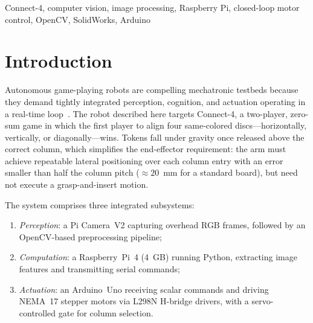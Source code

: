 \documentclass[conference]{IEEEtran}
\begin{document}
\begin{abstract}
This paper presents the design and implementation of an autonomous Vision-Based
Connect-4 Robot, a mechatronic system that integrates computer vision,
embedded computing, and robotic actuation. An RGB camera acquires frames of
a standard 7\(\times\)6 Connect-4 grid; a Python/OpenCV processing
pipeline performs geometric normalization, intensity conditioning, and noise
suppression; and two scalar image features drive closed-loop motor commands
transmitted over a serial link to an Arduino-controlled actuation stage.
The full pipeline has been validated on a Raspberry~Pi~4 (4~GB) and benchmarked
against a laptop platform. Execution times per operation range from
0.73~ms to 8.47~ms on the Raspberry~Pi. Output image quality is
bit-for-bit identical on both platforms. The mechanical assembly,
modeled in SolidWorks, uses a magazine-and-slide dispensing mechanism
with a servo-controlled gate for column selection.
\end{abstract}

\begin{IEEEkeywords}
Connect-4, computer vision, image processing, Raspberry Pi,
closed-loop motor control, OpenCV, SolidWorks, Arduino
\end{IEEEkeywords}

\section{Introduction}

Autonomous game-playing robots are compelling mechatronic testbeds because they
demand tightly integrated perception, cognition, and actuation operating in a
real-time loop~\cite{Zubek2021}. The robot described here targets Connect-4, a
two-player, zero-sum game in which the first player to align four same-colored
discs—horizontally, vertically, or diagonally—wins. Tokens fall under gravity
once released above the correct column, which simplifies the end-effector
requirement: the arm must achieve repeatable lateral positioning over each
column entry with an error smaller than half the column pitch
(\(\approx 20\)~mm for a standard board), but need not execute a
grasp-and-insert motion.

The system comprises three integrated subsystems:
\begin{enumerate}
\item \emph{Perception}: a Pi Camera~V2 capturing overhead RGB frames,
  followed by an OpenCV-based preprocessing pipeline;
\item \emph{Computation}: a Raspberry~Pi~4 (4~GB) running Python, extracting
  image features and transmitting serial commands;
\item \emph{Actuation}: an Arduino~Uno receiving scalar commands and driving
  NEMA~17 stepper motors via L298N H-bridge drivers, with a servo-controlled
  gate for column selection.
\end{enumerate}
\end{document}
